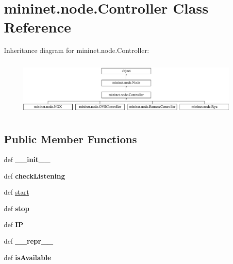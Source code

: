 \hypertarget{classmininet_1_1node_1_1Controller}{\section{mininet.\-node.\-Controller Class Reference}
\label{classmininet_1_1node_1_1Controller}
}
Inheritance diagram for mininet.\-node.\-Controller\-:\begin{figure}[H]
\begin{center}
\leavevmode
\includegraphics[height=2.916667cm]{classmininet_1_1node_1_1Controller}
\end{center}
\end{figure}
\subsection*{Public Member Functions}
\begin{DoxyCompactItemize}
\item 
\hypertarget{classmininet_1_1node_1_1Controller_a89e3723e45bedf6ad484a4a82ef73f0a}{def {\bfseries \-\_\-\-\_\-init\-\_\-\-\_\-}}\label{classmininet_1_1node_1_1Controller_a89e3723e45bedf6ad484a4a82ef73f0a}

\item 
\hypertarget{classmininet_1_1node_1_1Controller_ad6f82a1a6056b2894042686cf4cef19f}{def {\bfseries check\-Listening}}\label{classmininet_1_1node_1_1Controller_ad6f82a1a6056b2894042686cf4cef19f}

\item 
def \hyperlink{classmininet_1_1node_1_1Controller_a23e3b9dc42d2db34706239a65a997f70}{start}
\item 
\hypertarget{classmininet_1_1node_1_1Controller_ab63d40ad0bceef68ad27872bf95f3adb}{def {\bfseries stop}}\label{classmininet_1_1node_1_1Controller_ab63d40ad0bceef68ad27872bf95f3adb}

\item 
\hypertarget{classmininet_1_1node_1_1Controller_a8f78114d7f0a1d6af19cb84f17a7c273}{def {\bfseries I\-P}}\label{classmininet_1_1node_1_1Controller_a8f78114d7f0a1d6af19cb84f17a7c273}

\item 
\hypertarget{classmininet_1_1node_1_1Controller_aa162bac2708a851038a1e7872211d332}{def {\bfseries \-\_\-\-\_\-repr\-\_\-\-\_\-}}\label{classmininet_1_1node_1_1Controller_aa162bac2708a851038a1e7872211d332}

\item 
\hypertarget{classmininet_1_1node_1_1Controller_aebc0b5c063714b974b3fee15069eecc6}{def {\bfseries is\-Available}}\label{classmininet_1_1node_1_1Controller_aebc0b5c063714b974b3fee15069eecc6}

\end{DoxyCompactItemize}
